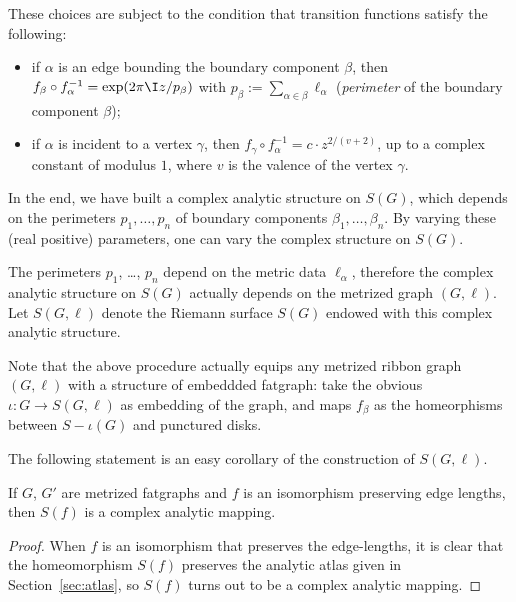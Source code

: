 These choices are subject to the condition that transition functions
satisfy the following:
\begin{itemize}
\item if $\alpha$ is an edge bounding the boundary component $\beta$, then $f_\beta
  \circ f_\alpha^{-1} = \exp (2\pi\I z / p_\beta)$ with $p_\beta := \sum_{\alpha \in \beta} \ell_\alpha$
  (\emph{perimeter} of the boundary component $\beta$);
\item if $\alpha$ is incident to a vertex $\gamma$, then $f_\gamma \circ f_\alpha^{-1} =
  c \cdot z^{2/(v+2)}$, up to a complex constant of modulus $1$, where
  $v$ is the valence of the vertex $\gamma$.
\end{itemize}

In the end, we have built a complex analytic structure on $S(G)$,
which depends on the perimeters $p_1, \ldots, p_n$ of boundary components
$\beta_1, \ldots, \beta_n$. By varying these (real positive) parameters, one can
vary the complex structure on $S(G)$.

The perimeters $p_1$, \ldots, $p_n$ depend on the metric data $\ell_\alpha$,
therefore the complex analytic structure on $S(G)$ actually depends on
the metrized graph $(G, \ell)$.  Let $S(G, \ell)$ denote the Riemann
surface $S(G)$ endowed with this complex analytic structure.

\begin{remark}
  Note that the above procedure actually equips any metrized ribbon
  graph $(G, \ell)$ with a structure of embeddded fatgraph: take the
  obvious $\iota:G \to S(G, \ell)$ as embedding of the graph, and maps $f_\beta$ as
  the homeorphisms between $S - \iota(G)$ and punctured disks.
\end{remark}

The following statement is an easy corollary of the construction of
$S(G, \ell)$.
\begin{lemma}
  \label{lemma:rg-morphism}
  If $G$, $G'$ are metrized fatgraphs and $f$ is an isomorphism
  preserving edge lengths, then $S(f)$ is a complex analytic mapping.
\end{lemma}
\begin{proof}
  When $f$ is an isomorphism that preserves the edge-lengths, it is
  clear that the homeomorphism $S(f)$ preserves the analytic atlas
  given in Section~\ref{sec:atlas}, so $S(f)$ turns out to be a complex
  analytic mapping.
\end{proof}


